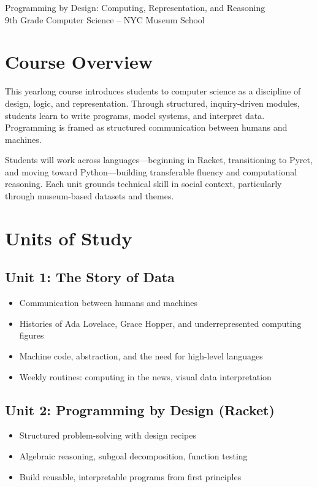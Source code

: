 \documentclass[11pt]{article}
\begin{document}
\begin{center}
\LARGE Programming by Design: Computing, Representation, and Reasoning \\
\normalsize 9th Grade Computer Science – NYC Museum School \\
\vspace{0.5em}
\end{center}

\section*{Course Overview}
This yearlong course introduces students to computer science as a discipline of design, logic, and representation. Through structured, inquiry-driven modules, students learn to write programs, model systems, and interpret data. Programming is framed as structured communication between humans and machines.

Students will work across languages—beginning in Racket, transitioning to Pyret, and moving toward Python—building transferable fluency and computational reasoning. Each unit grounds technical skill in social context, particularly through museum-based datasets and themes.

\section*{Units of Study}

\subsection*{Unit 1: The Story of Data}
\begin{itemize}[noitemsep]
  \item Communication between humans and machines
  \item Histories of Ada Lovelace, Grace Hopper, and underrepresented computing figures
  \item Machine code, abstraction, and the need for high-level languages
  \item Weekly routines: computing in the news, visual data interpretation
\end{itemize}

\subsection*{Unit 2: Programming by Design (Racket)}
\begin{itemize}[noitemsep]
  \item Structured problem-solving with design recipes
  \item Algebraic reasoning, subgoal decomposition, function testing
  \item Build reusable, interpretable programs from first principles
\end{itemize}
\end{document}
